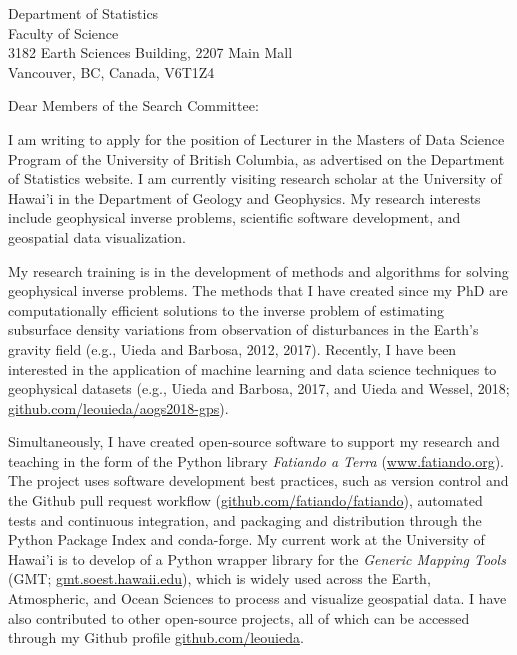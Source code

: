 \documentclass[11pt]{letter}
\begin{document}
\begin{letter}{
    Department of Statistics
    \\
    Faculty of Science
    \\
    3182 Earth Sciences Building, 2207 Main Mall
    \\
    Vancouver, BC, Canada, V6T1Z4
}
\opening{Dear Members of the Search Committee:}

I am writing to apply for the position of Lecturer in the Masters of Data
Science Program of the University of British Columbia, as advertised on the
Department of Statistics website.
I am currently visiting research scholar at the University of Hawai'i in the
Department of Geology and Geophysics.
My research interests include geophysical inverse problems, scientific
software development, and geospatial data visualization.

My research training is in the development of methods and algorithms for
solving geophysical inverse problems.
The methods that I have created since my PhD are computationally efficient
solutions to the inverse problem of estimating subsurface density variations
from observation of disturbances in the Earth's gravity field (e.g., Uieda and
Barbosa, 2012, 2017).
Recently, I have been interested in the application of machine learning and
data science techniques to geophysical datasets
(e.g., Uieda and Barbosa, 2017, and Uieda and Wessel, 2018;
\href{https://github.com/leouieda/aogs2018-gps}{github.com/leouieda/aogs2018-gps}).

Simultaneously, I have created open-source software to support my research and
teaching in the form of the Python library \textit{Fatiando a Terra}
(\href{http://www.fatiando.org/}{www.fatiando.org}).
The project uses software development best practices, such as version control
and the Github pull request workflow
(\href{https://github.com/fatiando/fatiando}{github.com/fatiando/fatiando}),
automated tests and continuous integration,
and packaging and distribution through the Python Package Index and
conda-forge.
My current work at the University of Hawai'i is to develop of a Python
wrapper library for the \textit{Generic Mapping Tools} (GMT;
\href{http://gmt.soest.hawaii.edu/}{gmt.soest.hawaii.edu}),
which is widely used across the Earth, Atmospheric, and
Ocean Sciences to process and visualize geospatial data.
I have also contributed to other open-source projects, all of which can be
accessed through my Github profile
\href{https://github.com/leouieda/}{github.com/leouieda}.


\end{letter}
\end{document}
